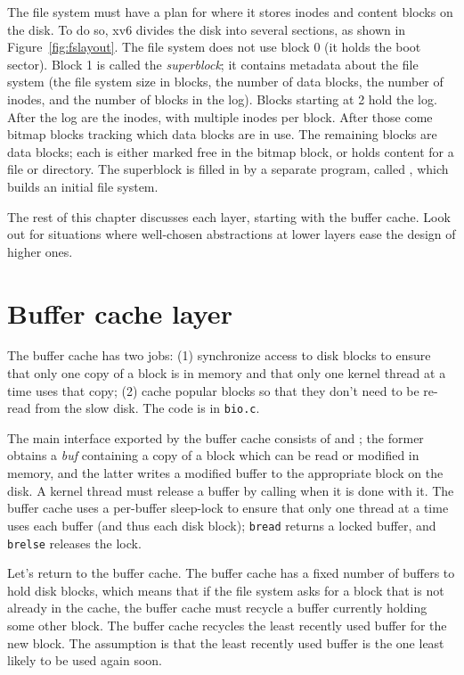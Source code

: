 The file system must have a plan for where it stores inodes and
content blocks on the disk.
To do so, xv6 divides the disk into several
sections, as shown in 
Figure~\ref{fig:fslayout}.
The file system does not use
block 0 (it holds the boot sector).  Block 1 is called the 
\textit{superblock}; 
it contains metadata about the file system (the file system size in blocks, the
number of data blocks, the number of inodes, and the number of blocks in the
log).  Blocks starting at 2 hold the log.  After the log are the inodes, with multiple inodes per block.  After
those come bitmap blocks tracking which data blocks are in use.
The remaining blocks are data blocks; each is either marked
free in the bitmap block, or holds content for a file or directory.
The superblock is filled in by a separate program, called
,
which builds an initial file system.

The rest of this chapter discusses each layer, starting with the
buffer cache.
Look out for situations where well-chosen abstractions at lower layers
ease the design of higher ones.
\section{Buffer cache layer}

The buffer cache has two jobs: (1) synchronize access to disk blocks to ensure
that only one copy of a block is in memory and that only one kernel thread at a time
uses that copy; (2) cache popular blocks so that they don't need to be re-read from
the slow disk. The code is in
\lstinline{bio.c}.

The main interface exported by the buffer cache consists of
and
;
the former obtains a
\textit{buf}
containing a copy of a block which can be read or modified in memory, and the
latter writes a modified buffer to the appropriate block on the disk.
A kernel thread must release a buffer by calling
when it is done with it.
The buffer cache uses a per-buffer sleep-lock to ensure
that only one thread at a time uses each buffer
(and thus each disk block);
\lstinline{bread}
returns a locked buffer, and
\lstinline{brelse}
releases the lock.

Let's return to the buffer cache.
The buffer cache has a fixed number of buffers to hold disk blocks,
which means that if the file system asks for a block that is not
already in the cache, the buffer cache must recycle a buffer currently
holding some other block. The buffer cache recycles the
least recently used buffer for the new block. The assumption is that
the least recently used buffer is the one least likely to be used
again soon.


